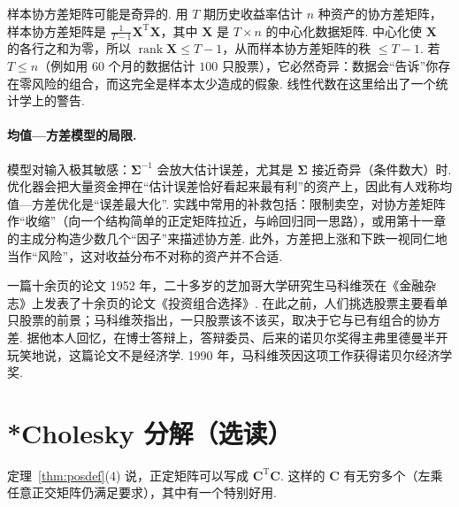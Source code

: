 \documentclass[lang=cn,10.5pt,scheme=chinese,toc=twocol,section,chinesefont=nofont,
twoside,citestyle=gb7714-2015,bibstyle=gb7714-2015]{elegantbook}
\DeclareRobustCommand{\textbf}[1]{{\lnsemiboldlatin\lnsemiboldcjk #1}}
\newcommand{\vv}[1]{\boldsymbol{#1}}
\newcommand{\trans}{\mathrm{T}}             %
\numberwithin{equation}{section}   %
\newcommand{\rk}{\operatorname{rank}}       %
\begin{document}
\begin{pitfallbox}
  \textbf{样本协方差矩阵可能是奇异的.} 用 $T$ 期历史收益率估计 $n$ 种资产的协方差矩阵，样本协方差矩阵是 $\frac1{T-1}\vv X^\trans\vv X$，其中 $\vv X$ 是 $T\times n$ 的中心化数据矩阵. 中心化使 $\vv X$ 的各行之和为零，所以 $\rk\vv X\le T-1$，从而样本协方差矩阵的秩 $\le T-1$. 若 $T\le n$（例如用 $60$ 个月的数据估计 $100$ 只股票），它必然奇异：数据会“告诉”你存在零风险的组合，而这完全是样本太少造成的假象. 线性代数在这里给出了一个统计学上的警告.
\end{pitfallbox}

\paragraph*{均值—方差模型的局限.} 模型对输入极其敏感：$\vv\Sigma^{-1}$ 会放大估计误差，尤其是 $\vv\Sigma$ 接近奇异（条件数大）时. 优化器会把大量资金押在“估计误差恰好看起来最有利”的资产上，因此有人戏称均值—方差优化是“误差最大化”. 实践中常用的补救包括：限制卖空，对协方差矩阵作“收缩”（向一个结构简单的正定矩阵拉近，与岭回归同一思路），或用第十一章的主成分构造少数几个“因子”来描述协方差. 此外，方差把上涨和下跌一视同仁地当作“风险”，这对收益分布不对称的资产并不合适.

\begin{historybox}{一篇十余页的论文}
  1952 年，二十多岁的芝加哥大学研究生马科维茨在《金融杂志》上发表了十余页的论文《投资组合选择》\cite{markowitz1952portfolio}. 在此之前，人们挑选股票主要看单只股票的前景；马科维茨指出，一只股票该不该买，取决于它与已有组合的\textbf{协方差}. 据他本人回忆，在博士答辩上，答辩委员、后来的诺贝尔奖得主弗里德曼半开玩笑地说，这篇论文不是经济学\cite{markowitz1991foundations}. 1990 年，马科维茨因这项工作获得诺贝尔经济学奖.
\end{historybox}

\section{*Cholesky 分解（选读）}

定理~\ref{thm:posdef}(4) 说，正定矩阵可以写成 $\vv C^\trans\vv C$. 这样的 $\vv C$ 有无穷多个（左乘任意正交矩阵仍满足要求），其中有一个特别好用.
\end{document}
